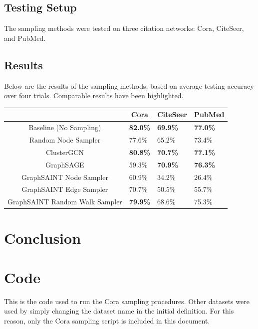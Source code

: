 \documentclass{article}
\begin{document}
	\subsection{Testing Setup}
	
	The sampling methods were tested on three citation networks: Cora, CiteSeer, and PubMed. 
	
	\subsection{Results}
	
	Below are the results of the sampling methods, based on average testing accuracy over four trials. Comparable results have been highlighted.

	\begin{table}
		\centering
		\begin{tabular}{c|l|l|l|}
			\cline{2-4}
			& \multicolumn{1}{c|}{Cora} & \multicolumn{1}{c|}{CiteSeer} & PubMed          \\ \hline
			\multicolumn{1}{|c|}{Baseline (No Sampling)}         & \textbf{82.0\%}           & \textbf{69.9\%}               & \textbf{77.0\%} \\ \hline
			\multicolumn{1}{|c|}{Random Node Sampler}            & 77.6\%                    & 65.2\%                        & 73.4\%          \\ \hline
			\multicolumn{1}{|c|}{ClusterGCN}                     & \textbf{80.8\%}           & \textbf{70.7\%}               & \textbf{77.1\%} \\ \hline
			\multicolumn{1}{|c|}{GraphSAGE}                      & 59.3\%                    & \textbf{70.9\%}               & \textbf{76.3\%} \\ \hline
			\multicolumn{1}{|c|}{GraphSAINT Node Sampler}        & 60.9\%                    & 34.2\%                        & 26.4\%          \\ \hline
			\multicolumn{1}{|c|}{GraphSAINT Edge Sampler}        & 70.7\%                    & 50.5\%                        & 55.7\%          \\ \hline
			\multicolumn{1}{|c|}{GraphSAINT Random Walk Sampler} & \textbf{79.9\%}           & 68.6\%                        & 75.3\%          \\ \hline
		\end{tabular}
	\end{table}

	
	
	\section{Conclusion}
	\pagebreak
	\appendix
	\section{Code}
	This is the code used to run the Cora sampling procedures. Other datasets were used by simply changing the dataset name in the initial definition. For this reason, only the Cora sampling script is included in this document. 
	
	

	
\end{document}

